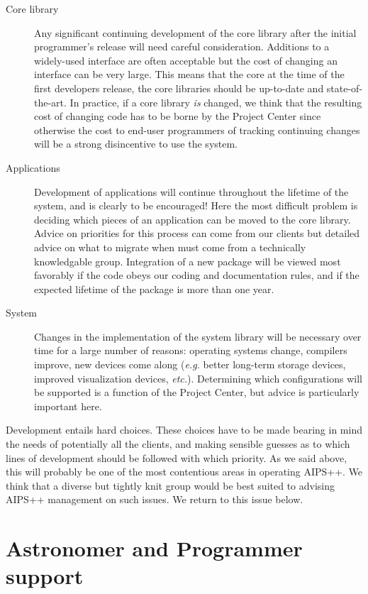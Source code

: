 \begin{description}
\item[Core library] Any significant continuing development of the core library
after the initial programmer's release will need careful
consideration.  Additions to a widely-used interface are often
acceptable but the cost of changing an interface can be very
large. This means that the core at the time of the first developers
release, the core libraries should be up-to-date and
state-of-the-art. In practice, if a core library {\em is} changed, we
think that the resulting cost of changing code has to be borne by the
Project Center since otherwise the cost to end-user programmers of
tracking continuing changes will be a strong disincentive to use the
system.
\item[Applications] Development of applications will continue
throughout the lifetime of the system, and is clearly to be 
encouraged! Here the most difficult problem is deciding which 
pieces of an application can be moved to the core library.
Advice on priorities for this process can come from our clients
but detailed advice on what to migrate when must come from a
technically knowledgable group. Integration of a new package will be
viewed most favorably if the code obeys our coding and documentation
rules, and if the expected lifetime of the package is more than
one year.
\item[System] Changes in the implementation of the system library 
will be necessary over time for a large number of reasons: operating
systems change, compilers improve, new devices come along ({\em e.g.}
better long-term storage devices, improved visualization devices, {\em
etc.}). Determining which configurations will be supported is a
function of the Project Center, but advice is particularly important
here.
\end{description}

Development entails hard choices. These choices have to be made
bearing in mind the needs of potentially all the clients, and making
sensible guesses as to which lines of development should be followed
with which priority. As we said above, this will probably be one of
the most contentious areas in operating AIPS++. We think that a
diverse but tightly knit group would be best suited to advising AIPS++
management on such issues.  We return to this issue below.

\section{Astronomer and Programmer support}


